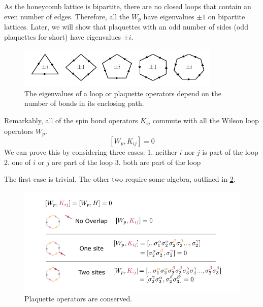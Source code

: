 As the honeycomb lattice is bipartite, there are no closed loops that contain an even number of edges. Therefore, all the \(W_p\) have eigenvalues \(\pm 1\) on bipartite lattices. Later, we will show that plaquettes with an odd number of sides (odd plaquettes for short) have eigenvalues \(\pm i\).

\hypertarget{fig:regular_plaquettes}{%
\begin{figure}
\centering
\includegraphics[width=0.86\textwidth,height=\textheight]{figure_code/amk_chapter/intro/regular_plaquettes/regular_plaquettes}
\caption[{Plaquettes in the Kitaev Model}]{The eigenvalues of a loop or plaquette operators depend on the number of bonds in its enclosing path.}
\label{fig:regular_plaquettes}
\end{figure}
}

Remarkably, all of the spin bond operators \(K_{ij}\) commute with all the Wilson loop operators \(W_p\). \[[W_p, K_{ij}] = 0\] We can prove this by considering three cases: 1. neither \(i\) nor \(j\) is part of the loop 2. one of \(i\) or \(j\) are part of the loop 3. both are part of the loop

The first case is trivial. The other two require some algebra, outlined in \cref{fig:visual_kitaev_2}.

\hypertarget{fig:visual_kitaev_2}{%
\begin{figure}
\centering
\includegraphics[width=1\textwidth,height=\textheight]{figure_code/amk_chapter/visual_kitaev_2}
\caption[{Plaquette Operators are Conserved}]{Plaquette operators are conserved.}
\label{fig:visual_kitaev_2}
\end{figure}
}

